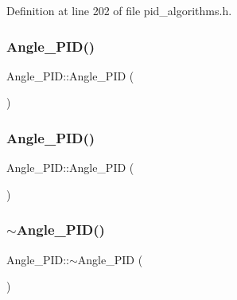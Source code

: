 Definition at line 202 of file pid\+\_\+algorithms.\+h.

\mbox{\label{class_angle___p_i_d_a282e2689a294ecb94c36a0b35ffb300f}} 
\subsubsection{\texorpdfstring{Angle\_PID()}{Angle\_PID()}\hspace{0.1cm}{\footnotesize\ttfamily [3/4]}}
{\footnotesize\ttfamily Angle\+\_\+\+P\+I\+D\+::\+Angle\+\_\+\+P\+ID (\begin{DoxyParamCaption}\item[{\mbox{\hyperlink{class_angle___p_i_d}{Angle\+\_\+\+P\+ID}} \&\&}]{ }\end{DoxyParamCaption})\hspace{0.3cm}{\ttfamily [default]}}

\mbox{\label{class_angle___p_i_d_a0fda8391de7ef06804c7655503805469}} 
\subsubsection{\texorpdfstring{Angle\_PID()}{Angle\_PID()}\hspace{0.1cm}{\footnotesize\ttfamily [4/4]}}
{\footnotesize\ttfamily Angle\+\_\+\+P\+I\+D\+::\+Angle\+\_\+\+P\+ID (\begin{DoxyParamCaption}\item[{const \mbox{\hyperlink{class_angle___p_i_d}{Angle\+\_\+\+P\+ID}} \&}]{ }\end{DoxyParamCaption})\hspace{0.3cm}{\ttfamily [default]}}

\mbox{\label{class_angle___p_i_d_a3dd451d850fd7805b36b0e969bf13e66}} 
\subsubsection{\texorpdfstring{$\sim$Angle\_PID()}{~Angle\_PID()}}
{\footnotesize\ttfamily Angle\+\_\+\+P\+I\+D\+::$\sim$\+Angle\+\_\+\+P\+ID (\begin{DoxyParamCaption}{ }\end{DoxyParamCaption})\hspace{0.3cm}{\ttfamily [inline]}}



